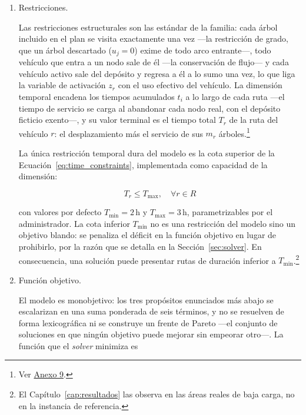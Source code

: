 \begin{enumerate}
\item Restricciones.

Las restricciones estructurales son las estándar de la familia: cada árbol incluido en el plan se
visita exactamente una vez ---la restricción de grado, que un árbol descartado ($u_j = 0$) exime de
todo arco entrante---, todo vehículo que entra a un nodo sale de él ---la conservación de flujo---
y cada vehículo activo sale del depósito y regresa a él a lo sumo una vez, lo que liga la variable
de activación $z_r$ con el uso efectivo del vehículo. La dimensión temporal encadena los tiempos
acumulados $t_i$ a lo largo de cada ruta ---el tiempo de servicio se carga al abandonar cada nodo
real, con el depósito ficticio exento---, y su valor terminal es el tiempo total $T_r$ de la ruta
del vehículo $r$: el desplazamiento más el servicio de sus $m_r$ árboles.\footnote{Ver
\hyperref[anx:formulacion]{Anexo 9}.}

La única restricción temporal dura del modelo es la cota superior de la
Ecuación~\ref{eq:time_constraints}, implementada como capacidad de la dimensión:

\begin{equation}
  T_r \leq T_{\max}, \quad \forall r \in R
  \label{eq:time_constraints}
\end{equation}

con valores por defecto $T_{\min} = 2\,\text{h}$ y $T_{\max} = 3\,\text{h}$, parametrizables por el
administrador. La cota inferior $T_{\min}$ no es una restricción del modelo sino un objetivo blando:
se penaliza el déficit en la función objetivo en lugar de prohibirlo, por la razón que se detalla en
la Sección~\ref{sec:solver}. En consecuencia, una solución puede presentar rutas de duración
inferior a $T_{\min}$.\footnote{El Capítulo~\ref{cap:resultados} las observa en las áreas reales
de baja carga, no en la instancia de referencia.}

\item Función objetivo.

El modelo es monobjetivo: los tres propósitos enunciados más abajo se escalarizan en una suma
ponderada de seis términos, y no se resuelven de forma lexicográfica ni se construye un frente de
Pareto ---el conjunto de soluciones en que ningún objetivo puede mejorar sin empeorar otro---. La
función que el \textit{solver} minimiza es


\end{enumerate}
